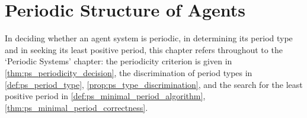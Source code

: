 \chapter{Periodic Structure of Agents}
\label{chap:agent-periodic}

\begin{remark}\label{rem:agent_ps_hook}
In deciding whether an agent system is periodic, in determining its period type and in seeking its least positive period, this chapter refers throughout to the `Periodic Systems' chapter:
the periodicity criterion is given in \cref{thm:ps_periodicity_decision},
the discrimination of period types in \cref{def:ps_period_type}, \cref{prop:ps_type_discrimination},
and the search for the least positive period in \cref{def:ps_minimal_period_algorithm}, \cref{thm:ps_minimal_period_correctness}.
\end{remark}

